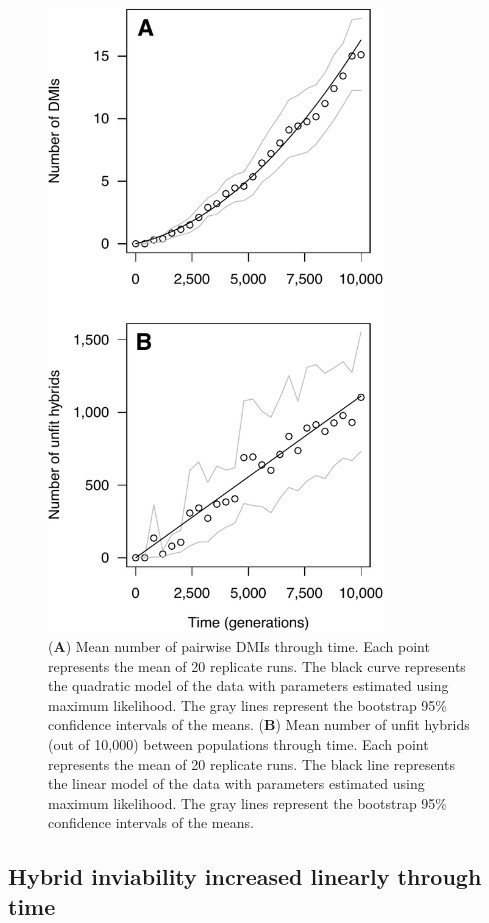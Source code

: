 \begin{doublespace}
\begin{figure}
\begin{center}
\includegraphics[width=3.5in]{dmi-and-hybrids.pdf}
\end{center}
\caption{
  (\textbf{A}) Mean number of pairwise DMIs through time.
  Each point represents the mean of 20 replicate runs.
  The black curve represents the quadratic model of the data
  with parameters estimated using maximum likelihood.
  The gray lines represent the bootstrap 95\% confidence intervals of the means.
  (\textbf{B}) Mean number of unfit hybrids (out of 10,000)
  between populations through time.
  Each point represents the mean of 20 replicate runs.
  The black line represents the linear model of the data
  with parameters estimated using maximum likelihood.
  The gray lines represent the bootstrap
  95\% confidence intervals of the means.}
\label{dmi-and-hybrids}
\end{figure}




\subsection{Hybrid inviability increased linearly through time}


\end{doublespace}
